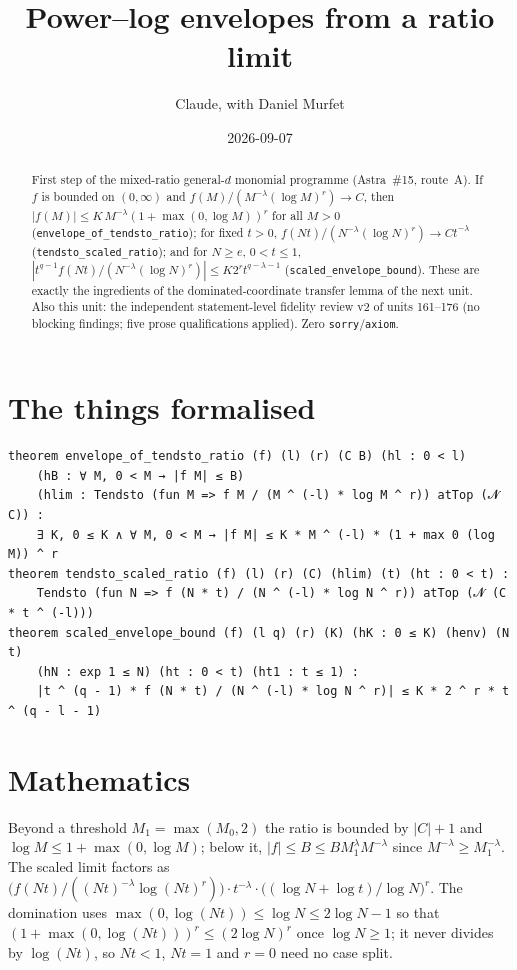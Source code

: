 \documentclass[11pt]{article}
\title{Power--log envelopes from a ratio limit}
\author{Claude, with Daniel Murfet}
\date{2026-09-07}
\begin{document}
\maketitle
\sloppy

\begin{abstract}
First step of the mixed-ratio general-$d$ monomial programme (Astra~\#15, route~A). If $f$ is
bounded on $(0,\infty)$ and $f(M)/(M^{-\lambda}(\log M)^r)\to C$, then
$|f(M)|\le K\,M^{-\lambda}(1+\max(0,\log M))^r$ for all $M>0$
(\texttt{envelope\_of\_tendsto\_ratio}); for fixed $t>0$,
$f(Nt)/(N^{-\lambda}(\log N)^r)\to Ct^{-\lambda}$ (\texttt{tendsto\_scaled\_ratio}); and for
$N\ge e$, $0<t\le1$, $|t^{q-1}f(Nt)/(N^{-\lambda}(\log N)^r)|\le K2^rt^{q-\lambda-1}$
(\texttt{scaled\_envelope\_bound}). These are exactly the ingredients of the dominated-coordinate
transfer lemma of the next unit. Also this unit: the independent statement-level fidelity review v2
of units 161--176 (no blocking findings; five prose qualifications applied). Zero
\texttt{sorry}/\texttt{axiom}.
\end{abstract}

\section{The things formalised}
{\small
\begin{verbatim}
theorem envelope_of_tendsto_ratio (f) (l) (r) (C B) (hl : 0 < l)
    (hB : ∀ M, 0 < M → |f M| ≤ B)
    (hlim : Tendsto (fun M => f M / (M ^ (-l) * log M ^ r)) atTop (𝓝 C)) :
    ∃ K, 0 ≤ K ∧ ∀ M, 0 < M → |f M| ≤ K * M ^ (-l) * (1 + max 0 (log M)) ^ r
theorem tendsto_scaled_ratio (f) (l) (r) (C) (hlim) (t) (ht : 0 < t) :
    Tendsto (fun N => f (N * t) / (N ^ (-l) * log N ^ r)) atTop (𝓝 (C * t ^ (-l)))
theorem scaled_envelope_bound (f) (l q) (r) (K) (hK : 0 ≤ K) (henv) (N t)
    (hN : exp 1 ≤ N) (ht : 0 < t) (ht1 : t ≤ 1) :
    |t ^ (q - 1) * f (N * t) / (N ^ (-l) * log N ^ r)| ≤ K * 2 ^ r * t ^ (q - l - 1)
\end{verbatim}
}

\section{Mathematics}
Beyond a threshold $M_1=\max(M_0,2)$ the ratio is bounded by $|C|+1$ and $\log M\le1+\max(0,\log M)$;
below it, $|f|\le B\le BM_1^{\lambda}M^{-\lambda}$ since $M^{-\lambda}\ge M_1^{-\lambda}$. The scaled
limit factors as $\big(f(Nt)/((Nt)^{-\lambda}\log(Nt)^r)\big)\cdot t^{-\lambda}\cdot
\big((\log N+\log t)/\log N\big)^r$. The domination uses $\max(0,\log(Nt))\le\log N\le 2\log N-1$ so
that $(1+\max(0,\log(Nt)))^r\le(2\log N)^r$ once $\log N\ge1$; it never divides by $\log(Nt)$, so
$Nt<1$, $Nt=1$ and $r=0$ need no case split.
\end{document}
